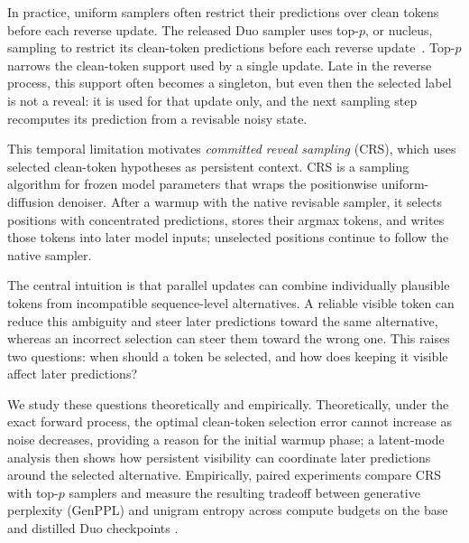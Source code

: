 \documentclass{article}
\newcommand{\1}{\mathbf 1}
\newcommand{\CRS}{\textsc{CRS}}
\theoremstyle{definition}
\begin{document}
In practice, uniform samplers often restrict their predictions over clean
tokens before each reverse update. The released Duo sampler uses top-$p$, or
nucleus, sampling to restrict its clean-token predictions before each reverse
update~\citep{holtzman2020curious,deschenaux2026psi}. Top-$p$ narrows the
clean-token support used by a single update. Late in the reverse process, this
support often becomes a singleton, but even then the selected label is not a
reveal: it is used for that update only, and the next sampling step recomputes its
prediction from a revisable noisy state.

This temporal limitation motivates \emph{committed reveal sampling} (\CRS), which uses selected clean-token hypotheses as persistent context. \CRS{} is a sampling algorithm for frozen model parameters that wraps the positionwise uniform-diffusion denoiser. After a warmup with the native revisable sampler, it selects positions with concentrated predictions, stores their argmax tokens, and writes those tokens into later model inputs; unselected positions continue to follow the native sampler.

The central intuition is that parallel updates can combine individually plausible tokens from incompatible sequence-level alternatives. A reliable visible token can reduce this ambiguity and steer later predictions toward the same alternative, whereas an incorrect selection can steer them toward the wrong one. This raises two questions: when should a token be selected, and how does keeping it visible affect later predictions?

We study these questions theoretically and empirically. Theoretically, under the exact forward process, the optimal clean-token selection error cannot increase as noise decreases, providing a reason for the initial warmup phase; a latent-mode analysis then shows how persistent visibility can coordinate later predictions around the selected alternative. Empirically, paired experiments compare CRS with top-$p$ samplers and measure the resulting tradeoff between generative perplexity (GenPPL) and unigram entropy across compute budgets on the base and distilled Duo checkpoints \citep{sahoo2025duo}.
\end{document}
